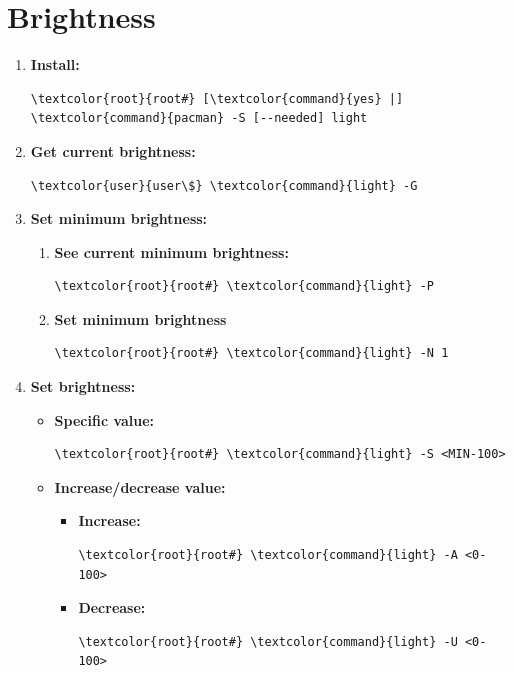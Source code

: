 \documentclass[10pt, a4paper, onecolumn, oneside, titlepage, openany]{book}
\begin{document}
\section{Brightness}
\begin{enumerate}
    \item \textbf{Install:}
\begin{Verbatim}[commandchars=\\\{\}]
\textcolor{root}{root#} [\textcolor{command}{yes} |] \textcolor{command}{pacman} -S [--needed] light
\end{Verbatim}
    \item \textbf{Get current brightness:}
\begin{Verbatim}[commandchars=\\\{\}]
\textcolor{user}{user\$} \textcolor{command}{light} -G
\end{Verbatim}
    \item \textbf{Set minimum brightness:}
    \begin{enumerate}
        \item \textbf{See current minimum brightness:}
\begin{Verbatim}[commandchars=\\\{\}]
\textcolor{root}{root#} \textcolor{command}{light} -P
\end{Verbatim}
        \item \textbf{Set minimum brightness}
\begin{Verbatim}[commandchars=\\\{\}]
\textcolor{root}{root#} \textcolor{command}{light} -N 1
\end{Verbatim}
    \end{enumerate}
    \item \textbf{Set brightness:}
    \begin{itemize}
        \item \textbf{Specific value:}
\begin{Verbatim}[commandchars=\\\{\}]
\textcolor{root}{root#} \textcolor{command}{light} -S <MIN-100>
\end{Verbatim}
        \item \textbf{Increase/decrease value:}
        \begin{itemize}
            \item \textbf{Increase:}
\begin{Verbatim}[commandchars=\\\{\}]
\textcolor{root}{root#} \textcolor{command}{light} -A <0-100>
\end{Verbatim}
            \item \textbf{Decrease:}
\begin{Verbatim}[commandchars=\\\{\}]
\textcolor{root}{root#} \textcolor{command}{light} -U <0-100>
\end{Verbatim}
        \end{itemize}
    \end{itemize}
\end{enumerate}
\end{document}
